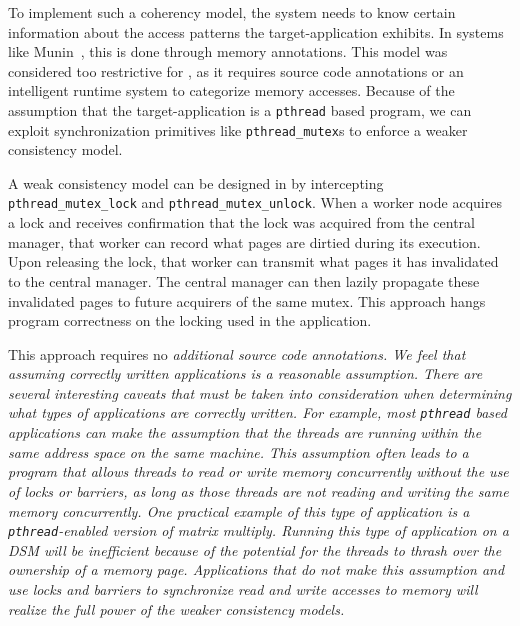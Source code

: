 To implement such a coherency model, the \projname{} system needs to know certain information about the access patterns the target-application exhibits.  In systems like Munin~\cite{Keleher:1992:LRC:139669.139676, Bennett:1990:MDS:99163.99182, Carter:1991:IPM:121132.121159, Zwaenepoel:1992:MDS:134397.135235}, this is done through memory annotations.  This model was considered too restrictive for \projname{}, as it requires source code annotations or an intelligent runtime system to categorize memory accesses.  Because of the assumption that the target-application is a \verb,pthread, based program, we can exploit synchronization primitives like \verb,pthread_mutex,s to enforce a weaker consistency model.  

A weak consistency model can be designed in \projname{} by intercepting \verb,pthread_mutex_lock, and \verb,pthread_mutex_unlock,.  When a worker node acquires a lock and receives confirmation that the lock was acquired from the central manager, that worker can record what pages are dirtied during its execution.  Upon releasing the lock, that worker can transmit what pages it has invalidated to the central manager.  The central manager can then lazily propagate these invalidated pages to future acquirers of the same mutex.  This approach hangs program correctness on the locking used in the application.

This approach requires no \em additional \em source code annotations.  We feel that assuming correctly written applications is a reasonable assumption.  There are several interesting caveats that must be taken into consideration when determining what types of applications are correctly written.  For example, most \verb,pthread, based applications can make the assumption that the threads are running within the same address space on the same machine.  This assumption often leads to a program that allows threads to read or write memory concurrently without the use of locks or barriers, as long as those threads are not reading and writing the \em same \em memory concurrently.  One practical example of this type of application is a \verb,pthread,-enabled version of matrix multiply.  Running this type of application on a DSM will be inefficient because of the potential for the threads to thrash over the ownership of a memory page.  Applications that do not make this assumption and use locks and barriers to synchronize read and write accesses to memory will realize the full power of the weaker consistency models.




